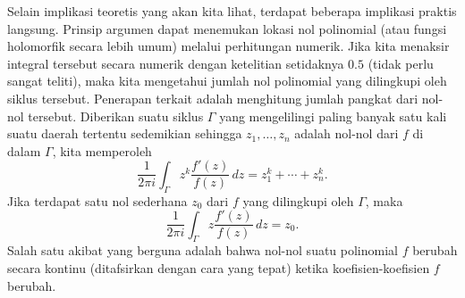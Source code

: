 \documentclass[12pt,openany]{book}
\theoremstyle{plain}
\theoremstyle{remark}
\theoremstyle{definition}
\theoremstyle{exercise}
\theoremstyle{example}
\begin{document}
Selain implikasi teoretis yang akan kita lihat,
terdapat beberapa implikasi praktis langsung.
Prinsip argumen dapat menemukan lokasi nol polinomial
(atau fungsi holomorfik secara lebih umum)
melalui perhitungan numerik. Jika kita menaksir integral tersebut secara numerik dengan
ketelitian setidaknya $0.5$ (tidak perlu sangat teliti),
maka kita mengetahui jumlah nol
polinomial yang dilingkupi oleh siklus tersebut.
Penerapan terkait adalah menghitung jumlah pangkat dari nol-nol tersebut.
Diberikan suatu siklus $\Gamma$ yang mengelilingi paling banyak
satu kali suatu daerah tertentu sedemikian sehingga $z_1,\ldots,z_n$ adalah nol-nol dari $f$
di dalam $\Gamma$, kita memperoleh
\begin{equation*}
\frac{1}{2\pi i}
\int_\Gamma z^k \frac{f'(z)}{f(z)} \, dz
=
z_1^k + \cdots + z_n^k .
\end{equation*}
Jika terdapat satu nol sederhana $z_0$ dari
$f$ yang dilingkupi oleh $\Gamma$, maka
\begin{equation*}
\frac{1}{2\pi i}
\int_\Gamma z \frac{f'(z)}{f(z)} \, dz
=
z_0 .
\end{equation*}
Salah satu akibat yang berguna adalah bahwa nol-nol suatu polinomial $f$ berubah secara kontinu
(ditafsirkan dengan cara yang tepat) ketika koefisien-koefisien $f$ berubah.
\end{document}
